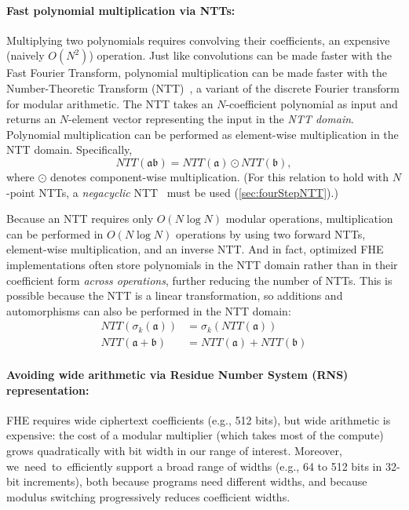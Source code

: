 \paragraph{Fast polynomial multiplication via NTTs:}
Multiplying two polynomials requires convolving their coefficients, an
expensive (naively $O(N^2)$) operation.
Just like convolutions can be made faster with the Fast Fourier Transform,
polynomial multiplication can be made faster with the Number-Theoretic Transform (NTT)~\cite{moenck1976practical},  %
a variant of the discrete Fourier transform for modular arithmetic.
The NTT takes an $N$\hyp{}coefficient polynomial as input and returns an $N$\hyp{}element vector representing the input in the
\textit{NTT domain}. Polynomial multiplication can be performed as element-wise multiplication in the NTT domain. Specifically,
\begin{equation*}
    NTT(\mathfrak{a}\mathfrak{b}) = NTT(\mathfrak{a}) \odot NTT(\mathfrak{b}),
\end{equation*}
where $\odot$ denotes component-wise multiplication.
(For this relation to hold with $N$\hyp{}point NTTs, a \emph{negacyclic} NTT~\cite{lyubashevsky:tact10:ideal} must be used (\autoref{sec:fourStepNTT}).)

Because an NTT requires only $O(N \log N)$ modular operations,
multiplication can be performed in $O(N \log N)$ operations by using two forward NTTs,
element-wise multiplication, and an inverse NTT.
And in fact, optimized FHE implementations often store polynomials in the NTT domain
rather than in their coefficient form \emph{across operations}, further reducing the number of NTTs.
This is possible because the NTT is a linear transformation, so additions and automorphisms can also be performed in the NTT domain:
\vspace{-0.05in} %
\begin{align*}
    NTT(\sigma_k(\mathfrak{a})) &= \sigma_k(NTT(\mathfrak{a})) \\
    NTT(\mathfrak{a} + \mathfrak{b}) &= NTT(\mathfrak{a}) + NTT(\mathfrak{b})
\end{align*}
\vspace{-0.2in}

\paragraph{Avoiding wide arithmetic via Residue Number System (RNS) representation:}
FHE requires wide ciphertext coefficients (e.g., 512 bits), but wide arithmetic is expensive:
the cost of a modular multiplier (which takes most of the compute)
grows quadratically with bit width in our range of interest.
Moreover, \mbox{we need to efficiently} %
support a broad range of widths (e.g., 64 to 512 bits in 32-bit increments),
both because programs need different widths, and because modulus switching progressively reduces coefficient widths.

